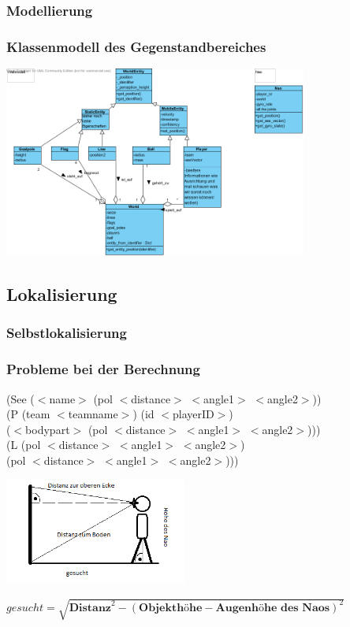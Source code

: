 \subsubsection{Modellierung}
\frame
{\frametitle{Klassenmodell des Gegenstandbereiches}
\begin{center}\includegraphics[height=6.3cm, center]{Weltenmodell.png}\end{center}
}

\subsection{Lokalisierung}

\subsubsection{Selbstlokalisierung}
\frame
{\frametitle{Probleme bei der Berechnung}
(See ($<$name$>$ (pol $<$distance$>$ $<$angle1$>$ $<$angle2$>$))\\
\hspace*{8mm}(P (team $<$teamname$>$) (id $<$playerID$>$)\\
\hspace*{13mm}($<$bodypart$>$ (pol $<$distance$>$ $<$angle1$>$ $<$angle2$>$)))\\
\hspace*{8mm}(L (pol $<$distance$>$ $<$angle1$>$ $<$angle2$>$) \\
\hspace*{13mm}(pol $<$distance$>$ $<$angle1$>$ $<$angle2$>$)))
\begin{center}\includegraphics[height=3.5cm, center]{Distanz_3D_Kugelkoordinaten_zu_2D_kartesisch.png}\end{center}
$gesucht = \sqrt{\textbf{Distanz}^2 - (\textbf{Objekthöhe} - \textbf{Augenhöhe des Naos})^2}$
}

